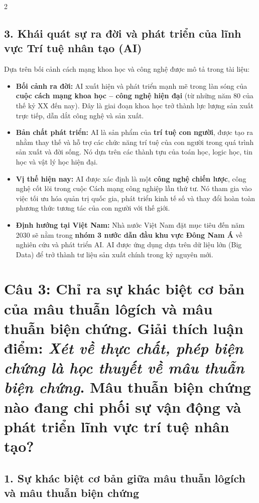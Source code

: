 \documentclass[9pt,a4paper]{extarticle}
\begin{document}
\begin{multicols*}{2}
\subsection*{3. Khái quát sự ra đời và phát triển của lĩnh vực Trí tuệ nhân tạo (AI)}

Dựa trên bối cảnh cách mạng khoa học và công nghệ được mô tả trong tài liệu:

\begin{itemize}
\item \textbf{Bối cảnh ra đời:} AI xuất hiện và phát triển mạnh mẽ trong làn sóng của \textbf{cuộc cách mạng khoa học -- công nghệ hiện đại} (từ những năm 80 của thế kỷ XX đến nay). Đây là giai đoạn khoa học trở thành lực lượng sản xuất trực tiếp, dẫn dắt công nghệ và sản xuất.
\item \textbf{Bản chất phát triển:} AI là sản phẩm của \textbf{trí tuệ con người}, được tạo ra nhằm thay thế và hỗ trợ các chức năng trí tuệ của con người trong quá trình sản xuất và đời sống. Nó dựa trên các thành tựu của toán học, logic học, tin học và vật lý học hiện đại.
\item \textbf{Vị thế hiện nay:} AI được xác định là một \textbf{công nghệ chiến lược}, công nghệ cốt lõi trong cuộc Cách mạng công nghiệp lần thứ tư. Nó tham gia vào việc tối ưu hóa quản trị quốc gia, phát triển kinh tế số và thay đổi hoàn toàn phương thức tương tác của con người với thế giới.
\item \textbf{Định hướng tại Việt Nam:} Nhà nước Việt Nam đặt mục tiêu đến năm 2030 sẽ nằm trong \textbf{nhóm 3 nước dẫn đầu khu vực Đông Nam Á} về nghiên cứu và phát triển AI. AI được ứng dụng dựa trên dữ liệu lớn (Big Data) để trở thành tư liệu sản xuất chính trong kỷ nguyên mới.
\end{itemize}

\section*{Câu 3: Chỉ ra sự khác biệt cơ bản của mâu thuẫn lôgích và mâu thuẫn biện chứng. Giải thích luận điểm: \textit{Xét về thực chất, phép biện chứng là học thuyết về mâu thuẫn biện chứng}. Mâu thuẫn biện chứng nào đang chi phối sự vận động và phát triển lĩnh vực trí tuệ nhân tạo?}

\subsection*{1. Sự khác biệt cơ bản giữa mâu thuẫn lôgích và mâu thuẫn biện chứng}


\end{multicols*}
\end{document}
